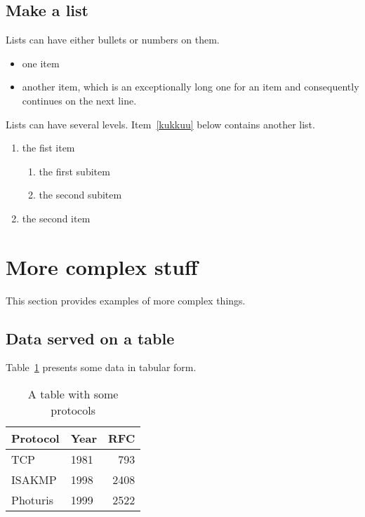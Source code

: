 \documentclass{cseminar}
\begin{document}
\subsection{Make a list}
\label{sec:list}

Lists can have either bullets or numbers on them. 

\begin{itemize}
\item one item
\item another item, which is an exceptionally long one for an item
  and consequently continues on the next line.
\end{itemize}

Lists can have several levels. Item~\ref{kukkuu} below contains
another list.
\begin{enumerate}
\item the fist item \label{kukkuu}
  \begin{enumerate}
  \item the first subitem 
  \item the second subitem
  \end{enumerate}
\item the second item
\end{enumerate}




\section{More complex stuff}

This section provides examples of more complex things.




\subsection{Data served on a table}


Table~\ref{tab:mytable1} presents some data in tabular form. 

\begin{table}[t]
  \begin{center}
    \begin{tabular}{|l|lr|}
    \hline
    Protocol & Year &  RFC \\
    \hline
    TCP      & 1981 &  793 \\
    ISAKMP   & 1998 & 2408 \\
    Photuris & 1999 & 2522 \\
    \hline
    \end{tabular}
    \caption{A table with some protocols}
    \label{tab:mytable1}
  \end{center}
\end{table}
\end{document}
